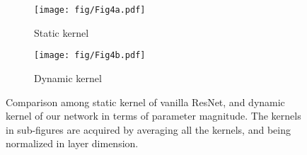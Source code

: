 \documentclass{article}
\begin{document}
\begin{figure}[t]
     \centering
     \begin{subfigure}[b]{0.3\columnwidth}
         \centering
         \texttt{[image: fig/Fig4a.pdf]}
         \caption{Static kernel}
     \end{subfigure}
     \hspace*{3em}
\begin{subfigure}[b]{0.3\columnwidth}
         \centering
         \texttt{[image: fig/Fig4b.pdf]}
         \caption{Dynamic kernel}
     \end{subfigure}
        \vspace{-0.2cm}
        \caption{Comparison among static kernel of vanilla ResNet, and dynamic kernel of our network in terms of parameter magnitude. The kernels in sub-figures are acquired by averaging all the kernels, and being normalized in layer dimension.
}
        \label{fig:kernel_visualize}
        \vspace{-0.2cm}
\end{figure}
\end{document}
